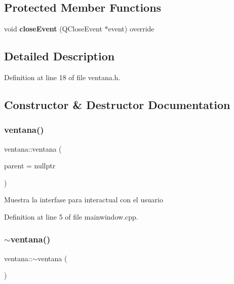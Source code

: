 \subsection*{Protected Member Functions}
\begin{DoxyCompactItemize}
\item 
\mbox{\label{classventana_a30671706472217e2ce8bdfa9fee8234a}} 
void {\bfseries close\+Event} (Q\+Close\+Event $\ast$event) override
\end{DoxyCompactItemize}


\subsection{Detailed Description}


Definition at line 18 of file ventana.\+h.



\subsection{Constructor \& Destructor Documentation}
\mbox{\label{classventana_afbce0fd8bf747b0209927282b17cdd6a}} 
\subsubsection{\texorpdfstring{ventana()}{ventana()}}
{\footnotesize\ttfamily ventana\+::ventana (\begin{DoxyParamCaption}\item[{Q\+Widget $\ast$}]{parent = {\ttfamily nullptr} }\end{DoxyParamCaption})\hspace{0.3cm}{\ttfamily [explicit]}}

Muestra la interfase para interactual con el usuario 

Definition at line 5 of file mainwindow.\+cpp.

\mbox{\label{classventana_a33913e071b5ce652bb85a731dbba44c4}} 
\subsubsection{\texorpdfstring{$\sim$ventana()}{~ventana()}}
{\footnotesize\ttfamily ventana\+::$\sim$ventana (\begin{DoxyParamCaption}{ }\end{DoxyParamCaption})\hspace{0.3cm}{\ttfamily [override]}}


